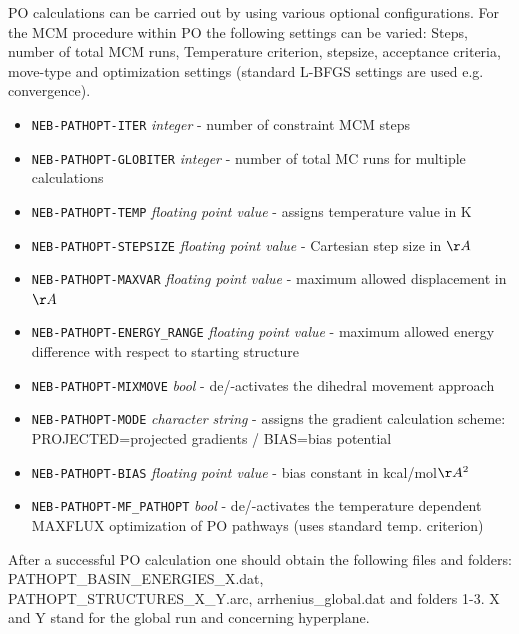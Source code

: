 \documentclass[10pt,a4paper]{article} %
\begin{document}
PO calculations can be carried out by using various optional configurations. For the MCM procedure within PO the following settings can be varied: Steps, number of total MCM runs, Temperature criterion, stepsize, acceptance criteria, move-type and optimization settings (standard L-BFGS settings are used e.g. convergence).
\begin{itemize}
	
	\item \texttt{NEB-PATHOPT-ITER} \textit{integer} - number of constraint MCM steps
	
	\item \texttt{NEB-PATHOPT-GLOBITER} \textit{integer} - number of total MC runs for multiple calculations
	
	\item \texttt{NEB-PATHOPT-TEMP} \textit{floating point value} - assigns temperature value in K
	
	\item \texttt{NEB-PATHOPT-STEPSIZE} \textit{floating point value} - Cartesian step size in $\AA$
	
	\item \texttt{NEB-PATHOPT-MAXVAR} \textit{floating point value} - maximum allowed displacement in $\AA$
	
	\item \texttt{NEB-PATHOPT-ENERGY\_RANGE} \textit{floating point value} - maximum allowed energy difference with respect to starting structure 
	
	\item \texttt{NEB-PATHOPT-MIXMOVE} \textit{bool} - de/-activates the dihedral movement approach
	
	\item \texttt{NEB-PATHOPT-MODE} \textit{character string} - assigns the gradient calculation scheme: PROJECTED=projected gradients / BIAS=bias potential
	
	\item \texttt{NEB-PATHOPT-BIAS} \textit{floating point value} - bias constant in kcal/mol$\AA^{2}$
	
	\item \texttt{NEB-PATHOPT-MF\_PATHOPT} \textit{bool} - de/-activates the temperature dependent MAXFLUX optimization of PO pathways (uses standard temp. criterion) 
	
\end{itemize}

After a successful PO calculation one should obtain the following files and folders: PATHOPT\_BASIN\_ENERGIES\_X.dat, PATHOPT\_STRUCTURES\_X\_Y.arc, arrhenius\_global.dat and folders 1-3. X and Y stand for the global run and concerning hyperplane.\newline
\end{document}
